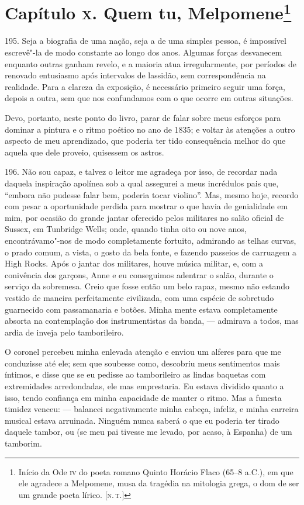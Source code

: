 \chapter{Capítulo \textsc{x}. Quem tu, Melpomene\footnote[*]{Início da Ode \textsc{iv} do poeta romano Quinto   Horácio Flaco (65--8 a.C.), em que ele agradece a Melpomene,
  musa da tragédia na mitologia grega, o dom de ser um grande poeta
  lírico. {[}\textsc{n.\,t.}{]}}}

195. Seja a biografia de uma nação, seja a de uma simples pessoa, é
impossível escrevê"-la de modo constante ao longo dos anos. Algumas
forças desvanecem enquanto outras ganham revelo, e a maioria atua
irregularmente, por períodos de renovado entusiasmo após intervalos de
lassidão, sem correspondência na realidade. Para a clareza da exposição,
é necessário primeiro seguir uma força, depois a outra, sem que nos
confundamos com o que ocorre em outras situações.

Devo, portanto, neste ponto do livro, parar de falar sobre meus esforços
para dominar a pintura e o ritmo poético no ano de 1835; e voltar às
atenções a outro aspecto de meu aprendizado, que poderia ter tido
consequência melhor do que aquela que dele proveio, quisessem os astros.

196. Não sou capaz, e talvez o leitor me agradeça por isso, de recordar
nada daquela inspiração apolínea sob a qual assegurei a meus incrédulos
pais que, ``embora não pudesse falar bem, poderia tocar violino''. Mas,
mesmo hoje, recordo com pesar a oportunidade perdida para mostrar o que
havia de genialidade em mim, por ocasião do grande jantar oferecido
pelos militares no salão oficial de Sussex, em Tunbridge Wells; onde,
quando tinha oito ou nove anos, encontrávamo"-nos de modo completamente
fortuito, admirando as telhas curvas, o prado comum, a vista, o gosto da
bela fonte, e fazendo passeios de carruagem a High Rocks. Após o jantar
dos militares, houve música militar, e, com a conivência dos garçons,
Anne e eu conseguimos adentrar o salão, durante o serviço da sobremesa.
Creio que fosse então um belo rapaz, mesmo não estando vestido de
maneira perfeitamente civilizada, com uma espécie de sobretudo
guarnecido com passamanaria e botões. Minha mente estava completamente
absorta na contemplação dos instrumentistas da banda, --- admirava a
todos, mas ardia de inveja pelo tamborileiro.

O coronel percebeu minha enlevada atenção e enviou um alferes para que
me conduzisse até ele; sem que soubesse como, descobriu meus sentimentos
mais íntimos, e disse que se eu pedisse ao tamborileiro as lindas
baquetas com extremidades arredondadas, ele mas emprestaria. Eu estava
dividido quanto a isso, tendo confiança em minha capacidade de manter o
ritmo. Mas a funesta timidez venceu: --- balancei negativamente minha
cabeça, infeliz, e minha carreira musical estava arruinada. Ninguém
nunca saberá o que eu poderia ter tirado daquele tambor, ou (se meu pai
tivesse me levado, por acaso, à Espanha) de um tamborim.

